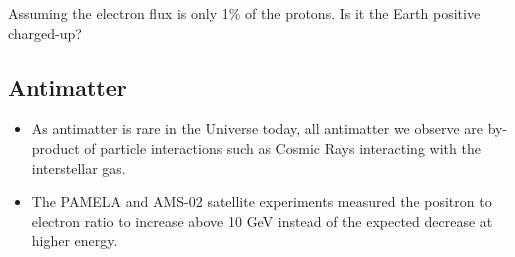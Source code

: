 \documentclass[
  letterpaper,
  DIV=11,
  numbers=noendperiod]{scrreprt}
\providecommand{\tightlist}{%
  \setlength{\itemsep}{0pt}\setlength{\parskip}{0pt}}\usepackage{longtable,booktabs,array}
\begin{document}
\begin{tcolorbox}[enhanced jigsaw, colframe=quarto-callout-note-color-frame, opacitybacktitle=0.6, left=2mm, leftrule=.75mm, opacityback=0, colbacktitle=quarto-callout-note-color!10!white, breakable, bottomrule=.15mm, toprule=.15mm, colback=white, coltitle=black, bottomtitle=1mm, toptitle=1mm, titlerule=0mm, title=\textcolor{quarto-callout-note-color}{\faInfo}\hspace{0.5em}{Question}, arc=.35mm, rightrule=.15mm]

Assuming the electron flux is only 1\% of the protons. Is it the Earth
positive charged-up?

\end{tcolorbox}

\subsection*{Antimatter}\label{antimatter}

\begin{itemize}
\tightlist
\item
  As antimatter is rare in the Universe today, all antimatter we observe
  are by-product of particle interactions such as Cosmic Rays
  interacting with the interstellar gas.
\item
  The PAMELA and AMS-02 satellite experiments measured the positron to
  electron ratio to increase above 10 GeV instead of the expected
  decrease at higher energy.
\end{itemize}
\end{document}
